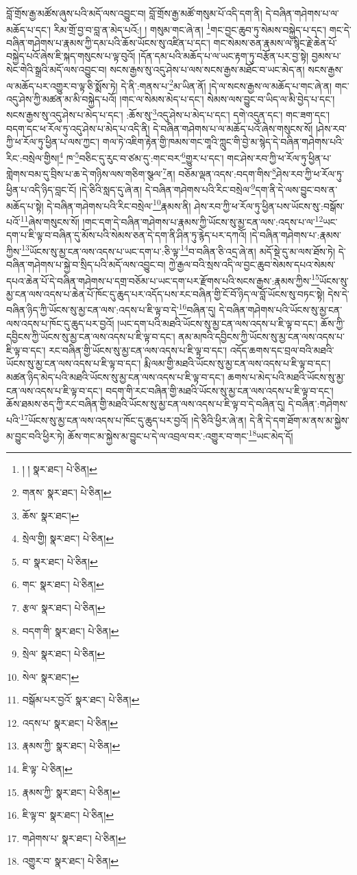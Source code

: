 བློ་གྲོས་རྒྱ་མཚོས་ཞུས་པའི་མདོ་ལས་འབྱུང་བ། བློ་གྲོས་རྒྱ་མཚོ་གསུམ་པོ་འདི་དག་ནི། དེ་བཞིན་གཤེགས་པ་ལ་མཆོད་པ་དང་། རིམ་གྲོ་བྱ་བ་བླ་ན་མེད་པའོ:། །
གསུམ་གང་ཞེ་ན། \footnote{། །   སྣར་ཐང་།  པེ་ཅིན། }གང་བྱང་ཆུབ་ཏུ་སེམས་བསྐྱེད་པ་དང་། གང་དེ་བཞིན་གཤེགས་པ་རྣམས་ཀྱི་དམ་པའི་ཆོས་ཡོངས་སུ་འཛིན་པ་དང་། གང་སེམས་ཅན་རྣམས་ལ་སྙིང་རྗེ་ཆེན་པོ་བསྐྱེད་པའོ་ཞེས་ཇི་སྐད་གསུངས་པ་ལྟ་བུའོ། །དོན་དམ་པའི་མཆོད་པ་ལ་ཡང་རྟག་ཏུ་བརྩོན་པར་བྱ་སྟེ། བྱམས་པ་སེང་གེའི་སྒྲའི་མདོ་ལས་འབྱུང་བ། སངས་རྒྱས་སུ་འདུ་ཤེས་པ་ལས་སངས་རྒྱས་མཐོང་བ་ཡང་མེད་ན། སངས་རྒྱས་ལ་མཆོད་པར་འགྱུར་བ་ལྟ་ཅི་སྨོས་ཏེ། དེ་ནི་:གནས་པ་\footnote{གནས་  སྣར་ཐང་།  པེ་ཅིན། }མ་ཡིན་ནོ། །དེ་ལ་སངས་རྒྱས་ལ་མཆོད་པ་གང་ཞེ་ན། གང་འདུ་ཤེས་ཀྱི་མཚན་མ་མི་བསྐྱེད་པའོ། །གང་ལ་སེམས་མེད་པ་དང་། སེམས་ལས་བྱུང་བ་ཡིད་ལ་མི་བྱེད་པ་དང་། སངས་རྒྱས་སུ་འདུ་ཤེས་པ་མེད་པ་དང་། :ཆོས་སུ་\footnote{ཆོས་  སྣར་ཐང་། }འདུ་ཤེས་པ་མེད་པ་དང་། དགེ་འདུན་དང་། གང་ཟག་དང་། བདག་དང་ཕ་རོལ་ཏུ་འདུ་ཤེས་པ་མེད་པ་འདི་ནི། དེ་བཞིན་གཤེགས་པ་ལ་མཆོད་པའོ་ཞེས་གསུངས་སོ། །ཤེས་རབ་ཀྱི་ཕ་རོལ་ཏུ་ཕྱིན་པ་ལས་ཀྱང་། གལ་ཏེ་འཇིག་རྟེན་གྱི་ཁམས་གང་གཱའི་ཀླུང་གི་བྱེ་མ་སྙེད་དེ་བཞིན་གཤེགས་པའི་རིང་:བསྲེལ་གྱིས།\footnote{སྲེལ་གྱི།  སྣར་ཐང་།  པེ་ཅིན། } ཁ་\footnote{བ་  སྣར་ཐང་།  པེ་ཅིན། }བཅིང་དུ་རུང་བ་ཙམ་དུ་:གང་བར་\footnote{གང་  སྣར་ཐང་།  པེ་ཅིན། }གྱུར་པ་དང་། གང་ཤེས་རབ་ཀྱི་ཕ་རོལ་ཏུ་ཕྱིན་པ་གླེགས་བམ་དུ་བྲིས་པ་ཆ་དེ་གཉིས་ལས་གཅིག་སྩལ་\footnote{རྩལ་  སྣར་ཐང་།  པེ་ཅིན། }ན། བཅོམ་ལྡན་འདས་:བདག་གིས་\footnote{བདག་གི་  སྣར་ཐང་།  པེ་ཅིན། }ཤེས་རབ་ཀྱི་ཕ་རོལ་ཏུ་ཕྱིན་པ་འདི་ཉིད་བླང་ངོ། །དེ་ཅིའི་སླད་དུ་ཞེ་ན། དེ་བཞིན་གཤེགས་པའི་རིང་བསྲེལ་\footnote{སྲེལ་  སྣར་ཐང་།  པེ་ཅིན། }དག་ནི་དེ་ལས་བྱུང་བས་ན་མཆོད་པ་སྟེ། དེ་བཞིན་གཤེགས་པའི་རིང་བསྲེལ་\footnote{སེལ་  སྣར་ཐང་། }རྣམས་ནི། ཤེས་རབ་ཀྱི་ཕ་རོལ་ཏུ་ཕྱིན་པས་ཡོངས་སུ་:བསྒོས་པའོ་\footnote{བསྒོམ་པར་བྱའོ་  སྣར་ཐང་།  པེ་ཅིན། }ཞེས་གསུངས་སོ། །གང་དག་དེ་བཞིན་གཤེགས་པ་རྣམས་ཀྱི་ཡོངས་སུ་མྱ་ངན་ལས་:འདས་པ་ལ་\footnote{འདས་པ་  སྣར་ཐང་།  པེ་ཅིན། }ཡང་དག་པ་ཇི་ལྟ་བ་བཞིན་དུ་མོས་པའི་སེམས་ཅན་དེ་དག་ནི་ཤིན་ཏུ་རྙེད་པར་དཀའོ། །དེ་བཞིན་གཤེགས་པ་:རྣམས་ཀྱིས་\footnote{རྣམས་ཀྱི་  སྣར་ཐང་།  པེ་ཅིན། }ཡོངས་སུ་མྱ་ངན་ལས་འདས་པ་ཡང་དག་པ་:ཅི་ལྟ་\footnote{ཇི་ལྟ་  པེ་ཅིན། }བ་བཞིན་ཅི་འདྲ་ཞེ་ན། མདོ་སྡེ་དུ་མ་ལས་ཐོས་ཏེ། དེ་བཞིན་གཤེགས་པ་སྐྱེ་བ་སྲིད་པའི་མདོ་ལས་འབྱུང་བ། ཀྱེ་རྒྱལ་བའི་སྲས་འདི་ལ་བྱང་ཆུབ་སེམས་དཔའ་སེམས་དཔའ་ཆེན་པོ་དེ་བཞིན་གཤེགས་པ་དགྲ་བཅོམ་པ་ཡང་དག་པར་རྫོགས་པའི་སངས་རྒྱས་:རྣམས་ཀྱིས་\footnote{རྣམས་ཀྱི་  སྣར་ཐང་།  པེ་ཅིན། }ཡོངས་སུ་མྱ་ངན་ལས་འདས་པ་ཆེན་པོ་ཁོང་དུ་ཆུད་པར་འདོད་པས་རང་བཞིན་གྱི་ངོ་བོ་ཉིད་ལ་བློ་ཡོངས་སུ་བཏང་སྟེ། དེས་དེ་བཞིན་ཉིད་ཀྱི་ཡོངས་སུ་མྱ་ངན་ལས་:འདས་པ་ཇི་ལྟ་བ་དེ་\footnote{ཇི་ལྟ་བ་  སྣར་ཐང་།  པེ་ཅིན། }བཞིན་དུ། དེ་བཞིན་གཤེགས་པའི་ཡོངས་སུ་མྱ་ངན་ལས་འདས་པ་ཁོང་དུ་ཆུད་པར་བྱའོ། །ཡང་དག་པའི་མཐའི་ཡོངས་སུ་མྱ་ངན་ལས་འདས་པ་ཇི་ལྟ་བ་དང་། ཆོས་ཀྱི་དབྱིངས་ཀྱི་ཡོངས་སུ་མྱ་ངན་ལས་འདས་པ་ཇི་ལྟ་བ་དང་། ནམ་མཁའི་དབྱིངས་ཀྱི་ཡོངས་སུ་མྱ་ངན་ལས་འདས་པ་ཇི་ལྟ་བ་དང་། རང་བཞིན་གྱི་ཡོངས་སུ་མྱ་ངན་ལས་འདས་པ་ཇི་ལྟ་བ་དང་། འདོད་ཆགས་དང་བྲལ་བའི་མཐའི་ཡོངས་སུ་མྱ་ངན་ལས་འདས་པ་ཇི་ལྟ་བ་དང་། རྨི་ལམ་གྱི་མཐའི་ཡོངས་སུ་མྱ་ངན་ལས་འདས་པ་ཇི་ལྟ་བ་དང་། མཚན་ཉིད་མེད་པའི་མཐའི་ཡོངས་སུ་མྱ་ངན་ལས་འདས་པ་ཇི་ལྟ་བ་དང་། ཆགས་པ་མེད་པའི་མཐའི་ཡོངས་སུ་མྱ་ངན་ལས་འདས་པ་ཇི་ལྟ་བ་དང་། བདག་གི་རང་བཞིན་གྱི་མཐའི་ཡོངས་སུ་མྱ་ངན་ལས་འདས་པ་ཇི་ལྟ་བ་དང་། ཆོས་ཐམས་ཅད་ཀྱི་རང་བཞིན་གྱི་མཐའི་ཡོངས་སུ་མྱ་ངན་ལས་འདས་པ་ཇི་ལྟ་བ་དེ་བཞིན་དུ། དེ་བཞིན་:གཤེགས་པའི་\footnote{གཤེགས་པ་  སྣར་ཐང་།  པེ་ཅིན། }ཡོངས་སུ་མྱ་ངན་ལས་འདས་པ་ཁོང་དུ་ཆུད་པར་བྱའོ། །དེ་ཅིའི་ཕྱིར་ཞེ་ན། དེ་ནི་དེ་དག་ཐོག་མ་ནས་མ་སྐྱེས་མ་བྱུང་བའི་ཕྱིར་ཏེ། ཆོས་གང་མ་སྐྱེས་མ་བྱུང་པ་དེ་ལ་འབྲལ་བར་:འགྱུར་བ་གང་\footnote{འགྱུར་བ་  སྣར་ཐང་།  པེ་ཅིན། }ཡང་མེད་དོ། 
